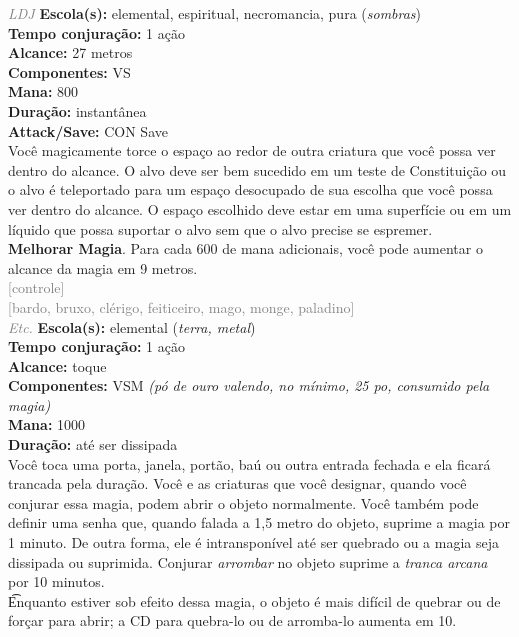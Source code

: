 \documentclass{RPG_Adventure}[2021/10/20]
\begin{document}
{\tiny \textcolor{gray}{\textit{LDJ}}}
{\small \t \textbf{Escola(s):} elemental, espiritual, necromancia, pura (\textit{sombras})\\\t \textbf{Tempo conjuração:} 1 ação\\\t \textbf{Alcance:} 27 metros\\\t \textbf{Componentes:} VS\\\t \textbf{Mana:} 800\\\t \textbf{Duração:} instantânea\\\t \textbf{Attack/Save:} CON Save\\}
{\normalsize Você magicamente torce o espaço ao redor de outra criatura que você possa ver dentro do alcance. O alvo deve ser bem sucedido em um teste de Constituição ou o alvo é teleportado para um espaço desocupado de sua escolha que você possa ver dentro do alcance. O espaço escolhido deve estar em uma superfície ou em um líquido que possa suportar o alvo sem que o alvo precise se espremer.\\\t \textbf{Melhorar Magia}. Para cada 600 de mana adicionais, você pode aumentar o alcance da magia em 9 metros.\\}
{\scriptsize \textcolor{gray}{[controle]\\}}
{\scriptsize \textcolor{gray}{[bardo, bruxo, clérigo, feiticeiro, mago, monge, paladino]\\}}
{\tiny \textcolor{gray}{\textit{Etc.}}}
{\small \t \textbf{Escola(s):} elemental (\textit{terra, metal})\\\t \textbf{Tempo conjuração:} 1 ação\\\t \textbf{Alcance:} toque\\\t \textbf{Componentes:} VSM \textit{(pó de ouro valendo, no mínimo, 25 po, consumido pela magia)}\\\t \textbf{Mana:} 1000\\\t \textbf{Duração:} até ser dissipada\\}
{\normalsize Você toca uma porta, janela, portão, baú ou outra entrada fechada e ela ficará trancada pela duração. Você e as criaturas que você designar, quando você conjurar essa magia, podem abrir o objeto normalmente. Você também pode definir uma senha que, quando falada a 1,5 metro do objeto, suprime a magia por 1 minuto. De outra forma, ele é intransponível até ser quebrado ou a magia seja dissipada ou suprimida. Conjurar \textit{arrombar} no objeto suprime a \textit{tranca arcana} por 10 minutos.\\\t Enquanto estiver sob efeito dessa magia, o objeto é mais difícil de quebrar ou de forçar para abrir; a CD para quebra-lo ou de arromba-lo aumenta em 10.\\}
\end{document}
